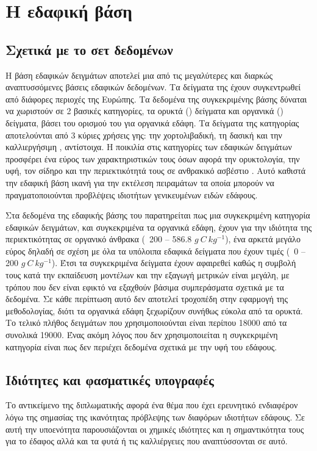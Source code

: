 \chapter{Η εδαφική βάση  }
\label{ch:lucas_soil}

\section{Σχετικά με το σετ δεδομένων}
Η βάση εδαφικών δειγμάτων  αποτελεί μια από τις μεγαλύτερες και διαρκώς αναπτυσσόμενες βάσεις εδαφικών δεδομένων. Τα δείγματα της έχουν συγκεντρωθεί από διάφορες περιοχές της Ευρώπης. 
Τα δεδομένα της συγκεκριμένης βάσης δύναται να χωριστούν σε 2 βασικές κατηγορίες, τα ορυκτά () δείγματα και οργανικά () δείγματα, βάσει του ορισμού του  για οργανικά εδάφη. Τα δείγματα της κατηγορίας  αποτελούνται από 3 κύριες χρήσεις γης: την χορτολιβαδική, τη δασική και την καλλιεργήσιμη , αντίστοιχα. Η ποικιλία στις κατηγορίες των εδαφικών δειγμάτων προσφέρει ένα εύρος των χαρακτηριστικών τους όσων αφορά την ορυκτολογία, την υφή, τον σίδηρο και την περιεκτικότητά τους σε ανθρακικό ασβέστιο \cite{nocita_lucas_soil}. Αυτό καθιστά την εδαφική βάση ικανή για την εκτέλεση πειραμάτων τα οποία μπορούν να πραγματοποιούνται προβλέψεις ιδιοτήτων γενικευμένων ειδών εδάφους.

Στα δεδομένα της εδαφικής βάσης του  παρατηρείται πως μια συγκεκριμένη κατηγορία εδαφικών δειγμάτων, και συγκεκριμένα τα οργανικά εδάφη, έχουν για την ιδιότητα της περιεκτικότητας σε οργανικό άνθρακα (~200 -- 586.8 $g~C~kg^{-1}$), ένα αρκετά μεγάλο εύρος δηλαδή σε σχέση με όλα τα υπόλοιπα εδαφικά δείγματα που έχουν τιμές (~0 -- 200 $g~C~kg^{-1}$). Έτσι τα συγκεκριμένα δείγματα έχουν αφαιρεθεί καθώς η συμβολή τους κατά την εκπαίδευση μοντέλων και την εξαγωγή μετρικών είναι μεγάλη, με τρόπου που δεν είναι εφικτό να εξαχθούν βάσιμα συμπεράσματα σχετικά με τα δεδομένα. Σε κάθε περίπτωση αυτό δεν αποτελεί τροχοπέδη στην εφαρμογή της μεθοδολογίας, διότι τα οργανικά εδάφη ξεχωρίζουν συνήθως εύκολα από τα ορυκτά. Το τελικό πλήθος δειγμάτων που χρησιμοποιούνται είναι περίπου 18000 από τα συνολικά 19000. Ένας ακόμη λόγος που δεν χρησιμοποιείται η συγκεκριμένη κατηγορία είναι πως δεν περιέχει δεδομένα σχετικά με την υφή του εδάφους.

\section{Ιδιότητες και φασματικές υπογραφές}
\label{sec:props-spectrograms}
Το αντικείμενο της διπλωματικής αφορά ένα θέμα που έχει ερευνητικό ενδιαφέρον λόγω της σημασίας της ικανότητας πρόβλεψης των διαφόρων ιδιοτήτων εδάφους. Σε αυτή την υποενότητα παρουσιάζονται οι χημικές ιδιότητες και η σημαντικότητα τους για το έδαφος αλλά και τα φυτά ή τις καλλιέργειες που αναπτύσσονται σε αυτό.

